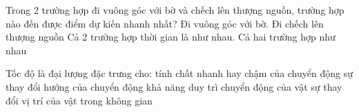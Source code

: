 \begin{ex}
Trong 2 trường hợp đi vuông góc với bờ và chếch lên thượng nguồn, trường hợp nào đến được điểm dự kiến nhanh nhất?
\choice
{\True Đi vuông góc với bờ.}
{Đi chếch lên thượng nguồn}
{Cả 2 trường hợp thời gian là như nhau.}
{Cả hai trường hợp như nhau}
\end{ex}


\begin{ex}
Tốc độ là đại lượng đặc trưng cho:
\choice
{\True tính chất nhanh hay chậm của chuyển động}
{sự thay đổi hướng của chuyển động}
{khả năng duy trì chuyển động của vật}
{sự thay đổi vị trí của vật trong không gian}
\end{ex}

